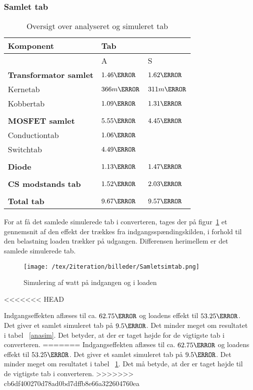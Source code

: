 \subsubsection{Samlet tab}
\begin{table}[H] 			
	\centering
	\begin{tabularx}{\textwidth}{|X|l|l|}
		\hline
		\textbf{\large Komponent} & \multicolumn{2}{|l|}{\textbf{\large Tab}} \\ \hline
		& A & S	\\ \hline
		\textbf{Transformator samlet} & $1.46\watt$ & $1.62\watt$ \\ \hline 
		Kernetab & $366m\watt$ & $311m\watt$ \\ \hline
		Kobbertab & $1.09\watt$ & $1.31\watt$ \\ \hline
		& &	\\ \hline
		\textbf{MOSFET samlet} & $5.55\watt$ & $4.45\watt$ \\ \hline
		Conductiontab & $1.06\watt$ & \\ \hline
		Switchtab & $4.49\watt$ & \\ \hline
		& &	\\ \hline
		\textbf{Diode} & $1.13\watt$ & $1.47\watt$ \\ \hline
		& &	\\ \hline
		\textbf{CS modstands tab} & $1.52\watt$ & $2.03\watt$ \\ \hline
		& &	\\ \hline
		\textbf{Total tab} & $9.67\watt$ & $9.57\watt$ \\ \hline
	\end{tabularx}
	\caption{Oversigt over analyseret og simuleret tab}
	\label{tab:anasim}
\end{table}

For at få det samlede simulerede tab i converteren, tages der på figur~\ref{fig: samletsimtab} et gennemsnit af den effekt der trækkes fra indgangsspændingskilden, i forhold til den belastning loaden trækker på udgangen. Differensen herimellem er det samlede simulerede tab.
\begin{figure}[H]
 	\center
 	\texttt{[image: /tex/2iteration/billeder/Samletsimtab.png]}
 	\caption{Simulering af watt på indgangen og i loaden}
 	\label{fig: samletsimtab}
\end{figure}
<<<<<<< HEAD

Indgangseffekten aflæses til ca. $62.75\watt$ og loadens effekt til $53.25\watt$. Det giver et samlet simuleret tab på $9.5\watt$. Det minder meget om resultatet i tabel ~\ref{anasim}. Det betyder, at der er taget højde for de vigtigste tab i converteren. 
=======
Indgangseffekten aflæses til ca. $62.75\watt$ og loadens effekt til $53.25\watt$. Det giver et samlet simuleret tab på $9.5\watt$. Det minder meget om resultatet i tabel ~\ref{tab:anasim}. Det må betyde, at der er taget højde til de vigtigste tab i converteren. 
>>>>>>> cb6df400270d78ad0bd7dffb8e66a322604760ea
